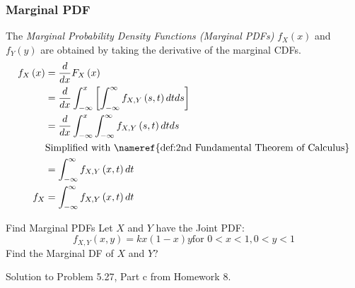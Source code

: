 		\subsubsection{Marginal PDF} \label{subsubsec:Marginal PDF}
			\begin{definition} \label{def:Marginal PDF}
				The \emph{Marginal Probability Density Functions (Marginal PDFs)} $f_{X} \left( x \right)$ and $f_{Y} \left( y \right)$ are obtained by taking the derivative of the marginal CDFs.
				\begin{equation}
					\begin{aligned}
						f_{X} \left( x \right) &= \frac{d}{dx} F_{X} \left( x \right) \\
						&= \frac{d}{dx} \int_{-\infty}^{x} \left[ \int_{-\infty}^{\infty} f_{X,Y} \left( s,t \right) dt ds \right] \\
						&= \frac{d}{dx} \int_{-\infty}^{x} \int_{-\infty}^{\infty} f_{X,Y} \left( s,t \right) dt ds \\
						&\text{Simplified with \nameref{def:2nd Fundamental Theorem of Calculus}} \\
						&= \int_{-\infty}^{\infty} f_{X,Y} \left( x,t \right) dt \\
						f_{X} &= \int_{-\infty}^{\infty} f_{X,Y} \left( x,t \right) dt \\
					\end{aligned}
				\end{equation}
			\end{definition}
			\begin{example}[Problem 5.27]{Find Marginal PDFs}
                          Let $X$ and $Y$ have the Joint PDF:
                          \begin{equation*}
                            f_{X,Y} \left( x,y \right) = k x \left( 1-x \right) y \text{for } 0<x<1, 0<y<1
                          \end{equation*}
                          Find the Marginal DF of $X$ and $Y$?

                          \tcblower

                          Solution to Problem 5.27, Part c from Homework 8.
			\end{example}
		
